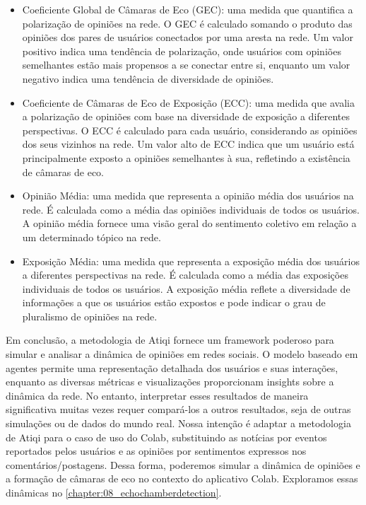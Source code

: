 \begin{itemize}
	\item Coeficiente Global de Câmaras de Eco (GEC): uma medida que quantifica a polarização de opiniões na rede. O GEC é calculado somando o produto das opiniões dos pares de usuários conectados por uma aresta na rede. Um valor positivo indica uma tendência de polarização, onde usuários com opiniões semelhantes estão mais propensos a se conectar entre si, enquanto um valor negativo indica uma tendência de diversidade de opiniões.
	\item Coeficiente de Câmaras de Eco de Exposição (ECC): uma medida que avalia a polarização de opiniões com base na diversidade de exposição a diferentes perspectivas. O ECC é calculado para cada usuário, considerando as opiniões dos seus vizinhos na rede. Um valor alto de ECC indica que um usuário está principalmente exposto a opiniões semelhantes à sua, refletindo a existência de câmaras de eco.
	\item Opinião Média: uma medida que representa a opinião média dos usuários na rede. É calculada como a média das opiniões individuais de todos os usuários. A opinião média fornece uma visão geral do sentimento coletivo em relação a um determinado tópico na rede.
	\item Exposição Média: uma medida que representa a exposição média dos usuários a diferentes perspectivas na rede. É calculada como a média das exposições individuais de todos os usuários. A exposição média reflete a diversidade de informações a que os usuários estão expostos e pode indicar o grau de pluralismo de opiniões na rede.
\end{itemize}

Em conclusão, a metodologia de Atiqi fornece um framework poderoso para simular e analisar a dinâmica de opiniões em redes sociais. O modelo baseado em agentes permite uma representação detalhada dos usuários e suas interações, enquanto as diversas métricas e visualizações proporcionam insights sobre a dinâmica da rede. No entanto, interpretar esses resultados de maneira significativa muitas vezes requer compará-los a outros resultados, seja de outras simulações ou de dados do mundo real. Nossa intenção é adaptar a metodologia de Atiqi para o caso de uso do Colab, substituindo as notícias por eventos reportados pelos usuários e as opiniões por sentimentos expressos nos comentários/postagens. Dessa forma, poderemos simular a dinâmica de opiniões e a formação de câmaras de eco no contexto do aplicativo Colab. Exploramos essas dinâmicas no \autoref{chapter:08_echochamberdetection}.